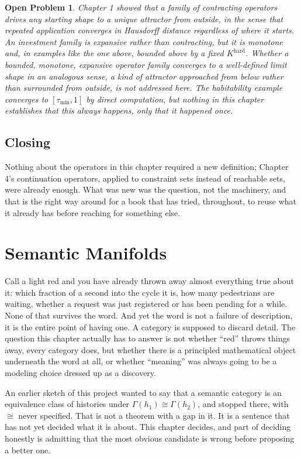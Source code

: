 \documentclass[11pt]{report}
\newtheorem{openproblem}{Open Problem}[chapter]
\begin{document}
\begin{openproblem}
Chapter 1 showed that a family of \emph{contracting} operators drives
any starting shape to a unique attractor from outside, in the sense
that repeated application converges in Hausdorff distance regardless
of where it starts. An investment family is expansive rather than
contracting, but it is monotone and, in examples like the one above,
bounded above by a fixed $K^{\mathrm{hard}}$. Whether a bounded,
monotone, expansive operator family converges to a well-defined limit
shape in an analogous sense, a kind of attractor approached from
below rather than surrounded from outside, is not addressed here.
The habitability example converges to $[\tau_{\min},1]$ by direct
computation, but nothing in this chapter establishes that this always
happens, only that it happened once.
\end{openproblem}

\section*{Closing}

Nothing about the operators in this chapter required a new
definition; Chapter 4's continuation operators, applied to constraint
sets instead of reachable sets, were already enough. What was new was
the question, not the machinery, and that is the right way around for
a book that has tried, throughout, to reuse what it already has before
reaching for something else.

\chapter{Semantic Manifolds}

Call a light red and you have already thrown away almost everything
true about it: which fraction of a second into the cycle it is, how
many pedestrians are waiting, whether a request was just registered
or has been pending for a while. None of that survives the word. And
yet the word is not a failure of description, it is the entire point
of having one. A category is supposed to discard detail. The question
this chapter actually has to answer is not whether ``red'' throws
things away, every category does, but whether there is a principled
mathematical object underneath the word at all, or whether ``meaning''
was always going to be a modeling choice dressed up as a discovery.

An earlier sketch of this project wanted to say that a semantic
category is an equivalence class of histories under
$\Gamma(h_1) \cong \Gamma(h_2)$, and stopped there, with $\cong$ never
specified. That is not a theorem with a gap in it. It is a sentence
that has not yet decided what it is about. This chapter decides,
and part of deciding honestly is admitting that the most obvious
candidate is wrong before proposing a better one.
\end{document}
